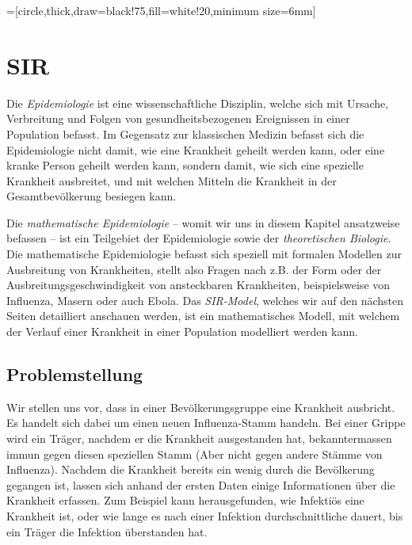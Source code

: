 \usetikzlibrary{arrows,shapes,snakes,automata,backgrounds,petri}
=[circle,thick,draw=black!75,fill=white!20,minimum size=6mm]

\chapter{SIR\label{chapter:sir}}
\begin{refsection}

Die \emph{Epidemiologie} ist eine wissenschaftliche Disziplin, welche sich mit Ursache, Verbreitung und Folgen von gesundheitsbezogenen Ereignissen in einer Population befasst.
Im Gegensatz zur klassischen Medizin befasst sich die Epidemiologie nicht damit, wie eine Krankheit geheilt werden kann, oder eine kranke Person geheilt werden kann, sondern damit, wie sich eine spezielle Krankheit ausbreitet, und mit welchen Mitteln die Krankheit in der Gesamtbevölkerung besiegen kann.

Die \emph{mathematische Epidemiologie} -- womit wir uns in diesem Kapitel ansatzweise befassen -- ist ein Teilgebiet der Epidemiologie sowie der \emph{theoretischen Biologie}.
Die mathematische Epidemiologie befasst sich speziell mit formalen Modellen zur Ausbreitung von Krankheiten, stellt also Fragen nach z.B. der Form oder der Ausbreitungsgeschwindigkeit von ansteckbaren Krankheiten, beispielsweise von Influenza, Masern oder auch Ebola. 
Das \emph{SIR-Model}, welches wir auf den nächsten Seiten detailliert anschauen werden, ist ein mathematisches Modell, mit welchem der Verlauf einer Krankheit in einer Population modelliert werden kann.

\section{Problemstellung}
Wir stellen uns vor, dass in einer Bevölkerungsgruppe eine Krankheit ausbricht. 
Es handelt sich dabei um einen neuen Influenza-Stamm handeln.
Bei einer Grippe wird ein Träger, nachdem er die Krankheit ausgestanden hat, bekanntermassen immun gegen diesen speziellen Stamm (Aber nicht gegen andere Stämme von Influenza).
Nachdem die Krankheit bereits ein wenig durch die Bevölkerung gegangen ist, lassen sich anhand der ersten Daten einige Informationen über die Krankheit erfassen.
Zum Beispiel kann herausgefunden, wie Infektiös eine Krankheit ist, oder wie lange es nach einer Infektion durchschnittliche dauert, bis ein Träger die Infektion überstanden hat.


\end{refsection}

